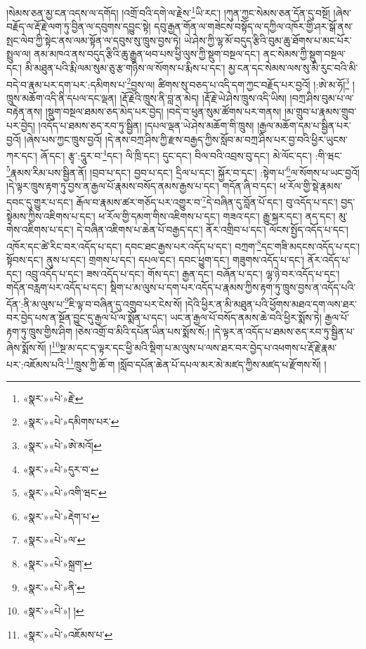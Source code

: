 །སེམས་ཅན་མྱ་ངན་འདས་ལ་དགོད། །འགྲོ་བའི་དགེ་ལ་རྗེས་\footnote{«སྣར་»«པེ་»རྗེ་}ཡི་རང་། །ཀུན་ཀྱང་སེམས་ཅན་དོན་དུ་བསྔོ། །ཞེས་བརྗོད་ལ་རྡོ་རྗེ་ལག་ཏུ་བྱིན་ལ་དབུགས་དབྱུང་སྟེ། དབུ་རྒྱན་གོན་ལ་གཟེངས་བསྟོད་ལ་དཀྱིལ་འཁོར་གྱི་ཤར་སྒོ་ནས་སྤང་ལེབ་ཀྱི་སྟེང་ནས་ལམ་སྟོན་ལ་དབུས་སུ་ཁྲུས་བྱས་ཏེ། ཡེ་ཤེས་ཀྱི་ལྷ་མོ་བདུད་རྩིའི་བུམ་ཆུ་ཐོགས་པ་མང་པོར་སྤྲུལ་ལ། ནམ་མཁའ་ནས་བདུད་རྩིའི་ཆུ་རྒྱུན་ཕབ་པས་ཕྱི་ལུས་ཀྱི་སྡུག་བསྔལ་དང་། ནང་སེམས་ཀྱི་སྡུག་བསྔལ་དང་། མི་མཐུན་པའི་རྨི་ལམ་སུམ་ཅུ་རྩ་གཉིས་ལ་སོགས་པ་རྨིས་པ་དང་། མྱ་ངན་དང་སེམས་ལས་སུ་མི་རུང་བའི་མི་བདེ་བ་རྣམ་པར་དག་པར་:དམིགས་པ་\footnote{«སྣར་»«པེ་»དམིགས་པར་}བྱས་ལ། ཚིགས་སུ་བཅད་པ་འདི་དག་ཀྱང་བརྗོད་པར་བྱའོ། །:ཨེ་མ་ཧོ།\footnote{«སྣར་»«པེ་»ཨེ་མའོ།} །ཁྲུས་མཆོག་འདི་ནི་དཔལ་དང་ལྡན། །རྡོ་རྗེའི་ཁྲུས་ནི་བླ་ན་མེད། །རྡོ་རྗེ་ཡེ་ཤེས་ཁྲུས་འདི་ཡིས། །བཀྲ་ཤིས་བུམ་པ་ལ་བརྟེན་ནས། །སྡུག་བསྔལ་ཐམས་ཅད་མེད་པར་བྱེད། །བདེ་བ་ཕུན་སུམ་ཚོགས་པར་གནས། །མ་གྲུབ་པ་རྣམས་གྲུབ་པར་བྱེད། །འདོད་པ་ཐམས་ཅད་རབ་ཏུ་སྦྱིན། །དཔལ་ལྡན་ཡེ་ཤེས་མཆོག་གི་ཁྲུས། །རྒྱལ་མཆོག་དམ་པ་སྦྱིན་པར་བྱའོ། །ཞེས་པས་ཀྱང་ཁྲུས་བྱའོ། །དེ་ནས་བཀྲ་ཤིས་ཀྱི་རྫས་བརྒྱད་ཀྱིས་སློབ་མ་བཀྲ་ཤིས་པར་བྱ་བའི་ཕྱིར་ཡུངས་ཀར་དང་། ཞོ་དང་། རྩྭ་:དཱུར་བ་\footnote{«སྣར་»«པེ་»དུར་བ་}དང་། ལི་ཁྲི་དང་། དུང་དང་། བིལ་བའི་འབྲས་བུ་དང་། མེ་ལོང་དང་། :གི་ཝང་\footnote{«སྣར་»«པེ་»འགི་ཝང་}རྣམས་རིམ་པས་སྦྱིན་ནོ། །བྲབ་པ་དང་། བྱབ་པ་དང་། དྲིལ་པ་དང་། སྐྱོར་བ་དང་། :སྟེག་པ་\footnote{«སྣར་»«པེ་»རྡེག་པ་}ལ་སོགས་པ་ཡང་བྱའོ། །དེ་ལྟར་ཁྲུས་རྟག་ཏུ་བྱས་ན་རྒྱལ་པོ་རྣམས་བསོད་ནམས་རྒྱས་པ་དང་། གདོན་ཞི་བ་དང་། ཕ་རོལ་གྱི་སྡེ་རྣམས་དབང་དུ་གྱུར་པ་དང་། རྒོལ་བ་རྣམས་ཚར་གཅོད་པར་འགྱུར་བ་\footnote{«སྣར་»«པེ་»ལ་}དེ་བཞིན་དུ་བློན་པོ་དང་། བུ་འདོད་པ་དང་། བྱད་སྟེམས་ཀྱིས་འཇིགས་པ་དང་། ཕ་རོལ་གྱི་དམག་གིས་འཇིགས་པ་དང་། གཟའ་དང་། རྒྱུ་སྐར་དང་། ནད་དང་། མུ་གེས་འཇིགས་པ་དང་། དེ་བཞིན་འཇིགས་པ་ཆེན་པོ་བརྒྱད་དང་། ནོར་འགྲིབ་པ་དང་། ལོངས་སྤྱོད་འདོད་པ་དང་། འཁོར་དང་ཚེ་རིང་བར་འདོད་པ་དང་། དབང་ཐང་རྒྱས་པར་འདོད་པ་དང་། བཀྲག་\footnote{«སྣར་»«པེ་»སྐྲག་}དང་གཟི་མདངས་འདོད་པ་དང་། སྟོབས་དང་། ནུས་པ་དང་། གྲགས་པ་དང་། དཔལ་དང་། དབང་ཕྱུག་དང་། གཟུགས་འདོད་པ་དང་། ནོར་འདོད་པ་དང་། འབྲུ་འདོད་པ་དང་། ཟས་འདོད་པ་དང་། གོས་དང་། རྒྱན་དང་། བཞོན་པ་དང་། ལྷ་ཉེ་བར་འདོད་པ་དང་། གདོན་བརླག་པར་འདོད་པ་དང་། སྡིག་པ་མ་ལུས་པ་དག་པར་འདོད་པ་རྣམས་ཀྱིས་རྟག་ཏུ་ཁྲུས་བྱས་ན་འདོད་པའི་དོན་:ནི་མ་ལུས་པ་\footnote{«སྣར་»«པེ་»ནི་}ཇི་ལྟ་བ་བཞིན་དུ་འགྲུབ་པར་ངེས་སོ། །དེའི་ཕྱིར་ན་མི་མཐུན་པའི་ཕྱོགས་མཐའ་དག་ལས་ཐར་བར་བྱེད་པས་ན་སྔོན་བྱུང་དུ་རྒྱལ་པོ་ལ་སྨོན་པ་དང་། ཡང་ན་རྒྱལ་པོ་བསོད་ནམས་ཆེ་བའི་ཕྱིར་སྨོས་ཏེ། རྒྱལ་པོ་རྟག་ཏུ་ཁྲུས་གྱིས་ཤིག །ཅེས་འགྲོ་བ་མིའི་དཔོན་ཡིན་པས་སྨོས་སོ:། །དེ་ལྟར་ན་འདོད་པ་ཐམས་ཅད་རབ་ཏུ་སྦྱིན་པ་ཞེས་སྨོས་སོ། །\footnote{«སྣར་»«པེ་»། །}སྔ་མ་དང་ད་ལྟར་དང་ཕྱི་མའི་སྡིག་པ་མ་ལུས་པ་ལས་ཐར་བར་བྱེད་པ་འཕགས་པ་རྡོ་རྗེ་རྣམ་པར་:འཇོམས་པའི་\footnote{«སྣར་»«པེ་»འཇོམས་པ་}ཁྲུས་ཀྱི་ཆོ་ག །སློབ་དཔོན་ཆེན་པོ་དཔལ་མར་མེ་མཛད་ཀྱིས་མཛད་པ་རྫོགས་སོ། ། 